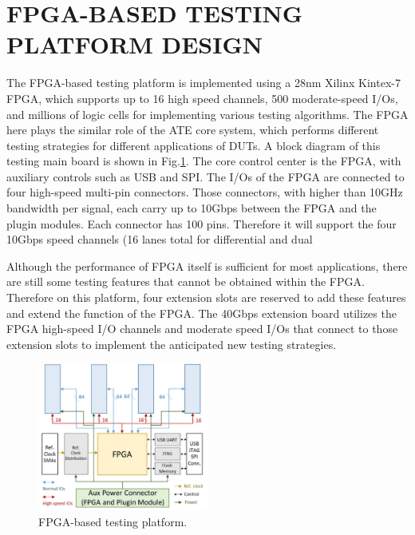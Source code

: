 \documentclass{article}
\begin{document}
\section{FPGA-BASED TESTING PLATFORM DESIGN}
The FPGA-based testing platform is implemented using a 28nm Xilinx Kintex-7 FPGA, which supports up to 16 high speed channels, 500 moderate-speed I/Os, and millions of logic cells for implementing various testing algorithms. The FPGA here plays the similar role of the ATE core system, which performs different testing strategies for different applications of DUTs. A block diagram of this testing main board is shown in Fig.\ref{fig:fig1}. The core control center is the FPGA, with auxiliary controls such as USB and SPI. The I/Os of the FPGA are connected to four high-speed multi-pin connectors. Those connectors, with higher than 10GHz bandwidth per signal, each carry up to 10Gbps between the FPGA and the plugin modules. Each connector has 100 pins. Therefore it will support the four 10Gbps speed channels (16 lanes total for differential and dual
\par
Although the performance of FPGA itself is sufficient for most applications, there are still some testing features that cannot be obtained within the FPGA. Therefore on this platform, four extension slots are reserved to add these features and extend the function of the FPGA. The 40Gbps extension board utilizes the FPGA high-speed I/O channels and moderate speed I/Os that connect to those extension slots to implement the anticipated new testing strategies.
\begin{figure}
\centering
\includegraphics[width=0.5\textwidth]{fig1.png}
\caption{\label{fig:fig1}FPGA-based testing platform.}
\end{figure}
\end{document}
